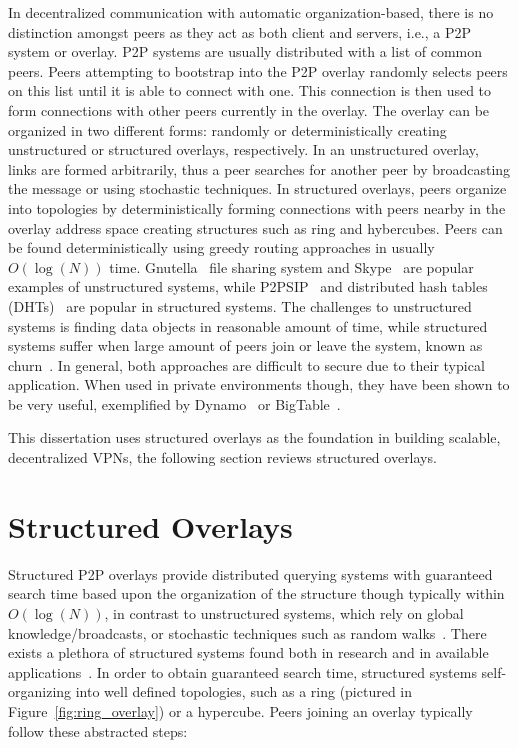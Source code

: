 In decentralized communication with automatic organization-based, there is no
distinction amongst peers as they act as both client and servers, i.e., a P2P
system or overlay.  P2P systems are usually distributed with a list of common
peers.  Peers attempting to bootstrap into the P2P overlay randomly selects
peers on this list until it is able to connect with one.  This connection is
then used to form connections with other peers currently in the overlay.  The
overlay can be organized in two different forms: randomly or deterministically
creating unstructured or structured overlays, respectively.  In an unstructured
overlay, links are formed arbitrarily, thus a peer searches for another peer by
broadcasting the message or using stochastic techniques.  In structured
overlays, peers organize into topologies by deterministically forming
connections with peers nearby in the overlay address space creating structures
such as ring and hybercubes.  Peers can be found deterministically using greedy
routing approaches in usually $O(\log(N))$ time.  Gnutella~\cite{gnutella} file
sharing system and Skype~\cite{skype} are popular examples of unstructured
systems, while P2PSIP~\cite{p2psip} and distributed hash tables
(DHTs)~\cite{chord} are popular in structured systems.  The challenges to
unstructured systems is finding data objects in reasonable amount of time,
while structured systems suffer when large amount of peers join or leave the
system, known as churn~\cite{opendht}.  In general, both approaches are
difficult to secure due to their typical application.  When used in private
environments though, they have been shown to be very useful, exemplified by
Dynamo~\cite{dynamo} or BigTable~\cite{bigtable}.

This dissertation uses structured overlays as the foundation in building
scalable, decentralized VPNs, the following section reviews structured
overlays.

\section{Structured Overlays}

Structured P2P overlays provide distributed querying systems with guaranteed
search time based upon the organization of the structure though typically
within $O(\log(N))$, in contrast to unstructured systems, which rely on global
knowledge/broadcasts, or stochastic techniques such as random
walks~\cite{unstructured_v_structured}.  There exists a plethora of structured
systems found both in research and in available applications~\cite{pastry,
chord, symphony, kademlia, can, brunet}.  In order to obtain guaranteed search
time, structured systems self-organizing into well defined topologies, such as
a ring (pictured in Figure~\ref{fig:ring_overlay}) or a hypercube.  Peers
joining an overlay typically follow these abstracted steps:

